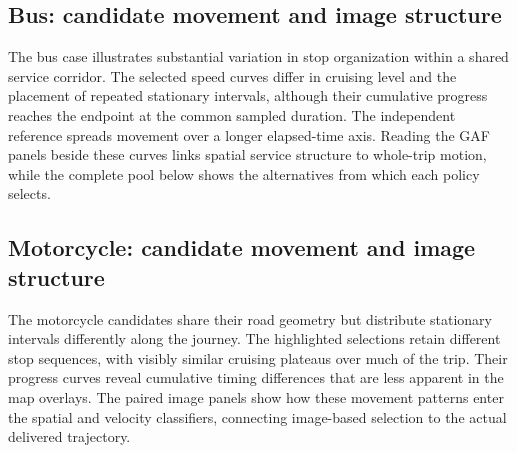 \subsection{Bus: candidate movement and image structure}
The bus case illustrates substantial variation in stop organization within a shared service corridor. The selected speed curves differ in cruising level and the placement of repeated stationary intervals, although their cumulative progress reaches the endpoint at the common sampled duration. The independent reference spreads movement over a longer elapsed-time axis. Reading the GAF panels beside these curves links spatial service structure to whole-trip motion, while the complete pool below shows the alternatives from which each policy selects.

\FloatBarrier

\subsection{Motorcycle: candidate movement and image structure}
The motorcycle candidates share their road geometry but distribute stationary intervals differently along the journey. The highlighted selections retain different stop sequences, with visibly similar cruising plateaus over much of the trip. Their progress curves reveal cumulative timing differences that are less apparent in the map overlays. The paired image panels show how these movement patterns enter the spatial and velocity classifiers, connecting image-based selection to the actual delivered trajectory.

\FloatBarrier

